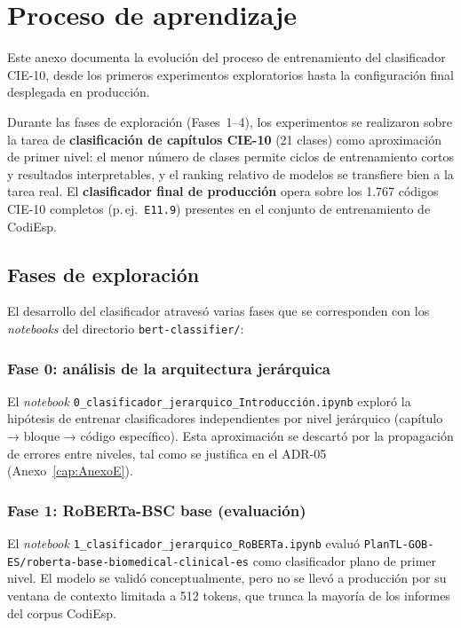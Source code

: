 \chapter{Proceso de aprendizaje}
\label{cap:AnexoF}

Este anexo documenta la evolución del proceso de entrenamiento del clasificador CIE-10, desde los primeros experimentos exploratorios hasta la configuración final desplegada en producción.

Durante las fases de exploración (Fases~1--4), los experimentos se realizaron sobre la tarea de \textbf{clasificación de capítulos CIE-10} (21 clases) como aproximación de primer nivel: el menor número de clases permite ciclos de entrenamiento cortos y resultados interpretables, y el ranking relativo de modelos se transfiere bien a la tarea real. El \textbf{clasificador final de producción} opera sobre los 1.767 códigos CIE-10 completos (p.\,ej.\ \texttt{E11.9}) presentes en el conjunto de entrenamiento de CodiEsp.

\section{Fases de exploración}

El desarrollo del clasificador atravesó varias fases que se corresponden con los \emph{notebooks} del directorio \texttt{bert-classifier/}:

\subsection{Fase 0: análisis de la arquitectura jerárquica}

El \emph{notebook} \texttt{0\_clasificador\_jerarquico\_Introducción.ipynb} exploró la hipótesis de entrenar clasificadores independientes por nivel jerárquico (capítulo → bloque → código específico). Esta aproximación se descartó por la propagación de errores entre niveles, tal como se justifica en el ADR-05 (Anexo~\ref{cap:AnexoE}).

\subsection{Fase 1: RoBERTa-BSC base (evaluación)}

El \emph{notebook} \texttt{1\_clasificador\_jerarquico\_RoBERTa.ipynb} evaluó \texttt{PlanTL-GOB-ES/\allowbreak{}roberta-base-\allowbreak{}biomedical-clinical-es} como clasificador plano de primer nivel. El modelo se validó conceptualmente, pero no se llevó a producción por su ventana de contexto limitada a 512 tokens, que trunca la mayoría de los informes del corpus CodiEsp.

